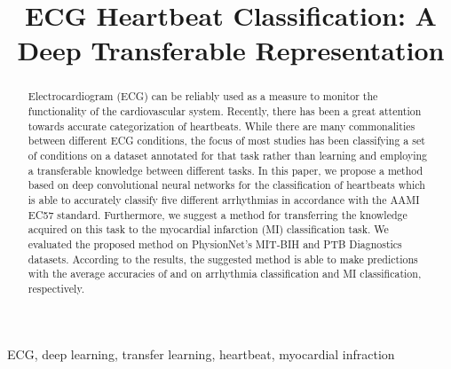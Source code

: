 \documentclass[10pt, conference, compsocconf]{IEEEtran}
\begin{document}
\title{
ECG Heartbeat Classification: A Deep Transferable Representation
}







\author{
}













\maketitle

\begin{abstract}



Electrocardiogram (ECG) can be reliably used as a measure to monitor the functionality of the cardiovascular system. Recently, there has been a great attention towards accurate categorization of heartbeats. While there are many commonalities between different ECG conditions, the focus of most studies has been classifying a set of conditions on a dataset annotated for that task rather than learning and employing a transferable knowledge between different tasks. In this paper, we propose a method based on deep convolutional neural networks for the classification of heartbeats which is able to accurately classify five different arrhythmias in accordance with the AAMI EC57 standard. Furthermore, we suggest a method for transferring the knowledge acquired on this task to the myocardial infarction (MI) classification task. We evaluated the proposed method on PhysionNet's MIT-BIH and PTB Diagnostics datasets. According to the results, the suggested method is able to make predictions with the average accuracies of \bm{} and \bm{} on arrhythmia classification and MI classification, respectively.
\end{abstract}

\begin{IEEEkeywords}
ECG, deep learning, transfer learning, heartbeat, myocardial infraction 
\end{IEEEkeywords}
\end{document}
